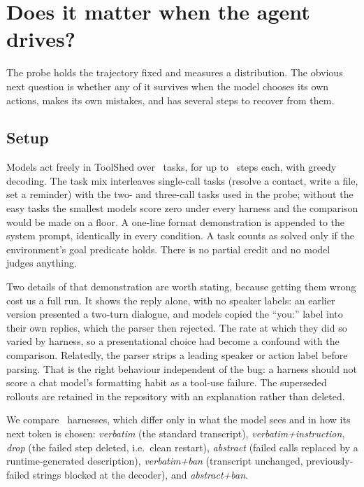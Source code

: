 \section{Does it matter when the agent drives?}
\label{sec:agent}

The probe holds the trajectory fixed and measures a distribution. The obvious
next question is whether any of it survives when the model chooses its own
actions, makes its own mistakes, and has several steps to recover from them.

\subsection{Setup}

Models act freely in ToolShed over \AgentNumTasks\ tasks, for up to
\AgentMaxSteps\ steps each, with greedy decoding. The task mix interleaves
single-call tasks (resolve a contact, write a file, set a reminder) with the two-
and three-call tasks used in the probe; without the easy tasks the smallest
models score zero under every harness and the comparison would be made on a
floor. A one-line format demonstration is appended to the system prompt,
identically in every condition. A task counts as solved only if the environment's goal predicate holds. There
is no partial credit and no model judges anything.

Two details of that demonstration are worth stating, because getting them wrong
cost us a full run. It shows the reply alone, with no speaker labels: an earlier
version presented a two-turn dialogue, and models copied the ``you:'' label into
their own replies, which the parser then rejected. The rate at which they did so
varied by harness, so a presentational choice had become a confound with the
comparison. Relatedly, the parser strips a leading speaker or action label
before parsing. That is the right behaviour independent of the bug: a harness
should not score a chat model's formatting habit as a tool-use failure. The
superseded rollouts are retained in the repository with an explanation rather
than deleted.

We compare \AgentNumHarnesses\ harnesses, which differ only in what the model
sees and in how its next token is chosen:
\emph{verbatim} (the standard transcript),
\emph{verbatim+instruction},
\emph{drop} (the failed step deleted, i.e.\ clean restart),
\emph{abstract} (failed calls replaced by a runtime-generated description),
\emph{verbatim+ban} (transcript unchanged, previously-failed strings blocked at
the decoder), and
\emph{abstract+ban}.

